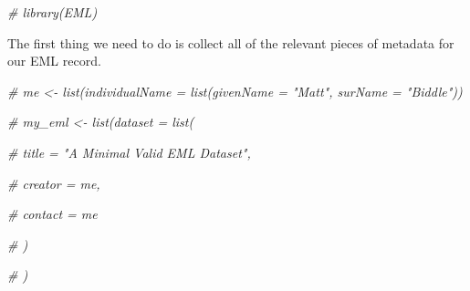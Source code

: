 \documentclass[
]{book}
\newenvironment{Shaded}{\begin{snugshade}}{\end{snugshade}}
\newcommand{\CommentTok}[1]{\textcolor[rgb]{0.56,0.35,0.01}{\textit{#1}}}
\begin{document}
\begin{Shaded}
\begin{Highlighting}[]
\CommentTok{\# library(EML)}
\end{Highlighting}
\end{Shaded}

The first thing we need to do is collect all of the relevant pieces of metadata for our EML record.

\begin{Shaded}
\begin{Highlighting}[]
\CommentTok{\# me \textless{}{-} list(individualName = list(givenName = "Matt", surName = "Biddle"))}

\CommentTok{\# my\_eml \textless{}{-} list(dataset = list(}

\CommentTok{\#                           title = "A Minimal Valid EML Dataset",}

\CommentTok{\#                           creator = me,}

\CommentTok{\#                           contact = me}

\CommentTok{\#                             )}

\CommentTok{\#                 )}
\end{Highlighting}
\end{Shaded}
\end{document}
